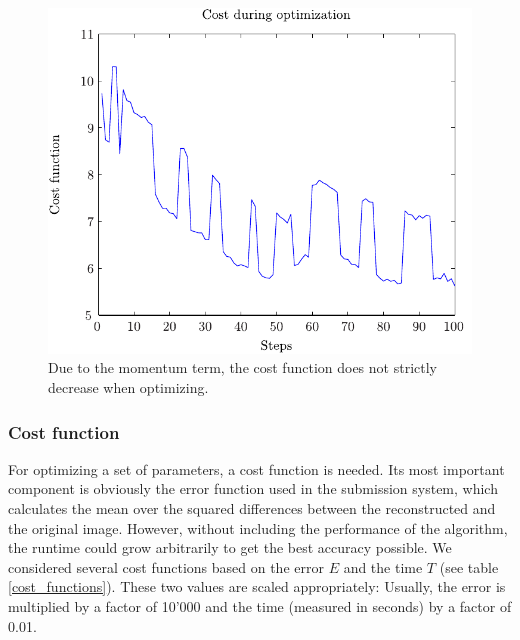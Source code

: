 \documentclass[10pt,conference,compsocconf]{IEEEtran}
\begin{document}
\begin{figure}
\centering
\includegraphics[width=0.8\columnwidth]{../plots/cost_plot.pdf}
\caption{Due to the momentum term, the cost function does not strictly decrease when optimizing.}
\label{gradient_descent_cost}
\end{figure}

\subsubsection{Cost function}
For optimizing a set of parameters, a cost function is needed. Its most important component is obviously the error function used in the submission system, which calculates the mean over the squared differences between the reconstructed and the original image. However, without including the performance of the algorithm, the runtime could grow arbitrarily to get the best accuracy possible. We considered several cost functions based on the error $E$ and the time $T$ (see table \ref{cost_functions}). These two values are scaled appropriately: Usually, the error is multiplied by a factor of 10'000 and the time (measured in seconds) by a factor of 0.01.
\end{document}
